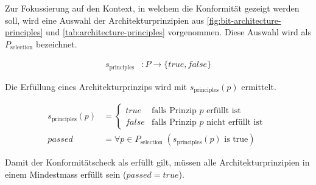 Zur Fokussierung auf den Kontext, in welchem die Konformität gezeigt werden soll, wird eine Auswahl der Architekturprinzipien aus \autoref{fig:bit-architecture-principles} und \autoref{tab:architecture-principles} vorgenommen. Diese Auswahl wird als $P_{\text{selection}}$ bezeichnet.

\begin{align}
s_{\text{principles}} &: P \rightarrow \{true,false\}
\end{align}

Die Erfüllung eines Architekturprinzips wird mit $s_{\text{principles}}(p)$ ermittelt.

\begin{align}
s_{\text{principles}}(p) &=
\begin{cases}
true & \text{falls Prinzip } p \text{ erfüllt ist } \\
false & \text{falls Prinzip } p \text{ nicht erfüllt ist }
\end{cases}
\\
passed &= \forall p \in P_{\text{selection}} \; ( s_{\text{principles}}(p) \text{ is true} )
\end{align}

Damit der Konformitätscheck als erfüllt gilt, müssen alle Architekturprinzipien in einem Mindestmass erfüllt sein ($passed = true$).


